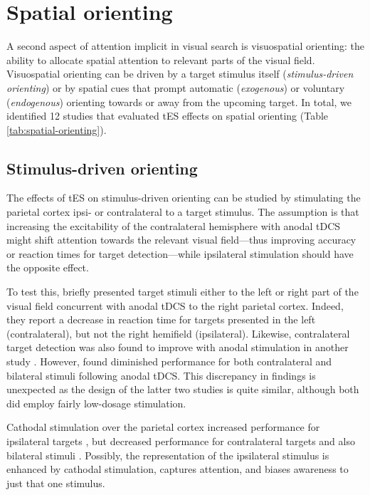 \documentclass[11pt,]{memoir}
\begin{document}
\hypertarget{spatial-orienting}{%
\section{Spatial orienting}\label{spatial-orienting}}

A second aspect of attention implicit in visual search is visuospatial orienting: the ability to allocate spatial attention to relevant parts of the visual field. Visuospatial orienting can be driven by a target stimulus itself (\emph{stimulus-driven orienting}) or by spatial cues that prompt automatic (\emph{exogenous}) or voluntary (\emph{endogenous}) orienting towards or away from the upcoming target. In total, we identified 12 studies that evaluated tES effects on spatial orienting (Table \ref{tab:spatial-orienting}).

\hypertarget{stimulus-driven-orienting}{%
\subsection{Stimulus-driven orienting}\label{stimulus-driven-orienting}}

The effects of tES on stimulus-driven orienting can be studied by stimulating the parietal cortex ipsi- or contralateral to a target stimulus. The assumption is that increasing the excitability of the contralateral hemisphere with anodal tDCS might shift attention towards the relevant visual field---thus improving accuracy or reaction times for target detection---while ipsilateral stimulation should have the opposite effect.

To test this, \textcite{Bolognini2010a} briefly presented target stimuli either to the left or right part of the visual field concurrent with anodal tDCS to the right parietal cortex. Indeed, they report a decrease in reaction time for targets presented in the left (contralateral), but not the right hemifield (ipsilateral). Likewise, contralateral target detection was also found to improve with anodal stimulation in another study \autocite{Sparing2009}. However, \textcite{Filmer2015} found diminished performance for both contralateral and bilateral stimuli following anodal tDCS. This discrepancy in findings is unexpected as the design of the latter two studies is quite similar, although both did employ fairly low-dosage stimulation.

Cathodal stimulation over the parietal cortex increased performance for ipsilateral targets \autocite{Sparing2009}, but decreased performance for contralateral targets and also bilateral stimuli \autocites{Filmer2015}{Sparing2009}. Possibly, the representation of the ipsilateral stimulus is enhanced by cathodal stimulation, captures attention, and biases awareness to just that one stimulus.
\end{document}
